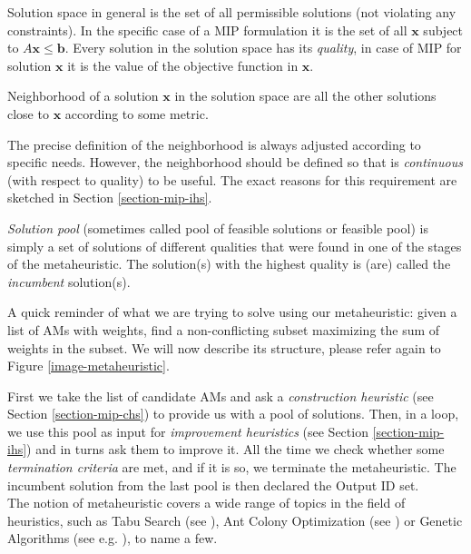 \begin{define}
	Solution space in general is the set of all permissible solutions (not violating any constraints). In the specific case of a MIP formulation it is the set of all $\mathbf{x}$ subject to $A\mathbf{x} \leqslant \mathbf{b}$. Every solution in the solution space has its \textit{quality}, in case of MIP for solution $\mathbf{x}$ it is the value of the objective function in $\mathbf{x}$.
\end{define}

\begin{define}
	Neighborhood of a solution $\mathbf{x}$ in the solution space are all the other solutions close to $\mathbf{x}$ according to some metric.
\end{define}

The precise definition of the neighborhood is always adjusted according to specific needs. However, the neighborhood should be defined so that is \textit{continuous} (with respect to quality) to be useful. The exact reasons for this requirement are sketched in Section \ref{section-mip-ihs}.

\begin{define}
	\textit{Solution pool} (sometimes called pool of feasible solutions or feasible pool) is simply a set of solutions of different qualities that were found in one of the stages of the metaheuristic. The solution(s) with the highest quality is (are) called the \textit{incumbent} solution(s).
\end{define}

A quick reminder of what we are trying to solve using our metaheuristic: given a list of AMs with weights, find a non-conflicting subset maximizing the sum of weights in the subset. We will now describe its structure, please refer again to Figure \ref{image-metaheuristic}.

First we take the list of candidate AMs and ask a \textit{construction heuristic} (see Section \ref{section-mip-chs}) to provide us with a pool of solutions. Then, in a loop, we use this pool as input for \textit{improvement heuristics} (see Section \ref{section-mip-ihs}) and in turns ask them to improve it. All the time we check whether some \textit{termination criteria} are met, and if it is so, we terminate the metaheuristic. The incumbent solution from the last pool is then declared the Output ID set.\\

The notion of metaheuristic covers a wide range of topics in the field of heuristics, such as Tabu Search (see \cite{Glover:1997:TS:549765}), Ant Colony Optimization (see \cite{dorigo2004ant}) or Genetic Algorithms (see e.g. \cite{goldberg1989genetic}), to name a few.\\

